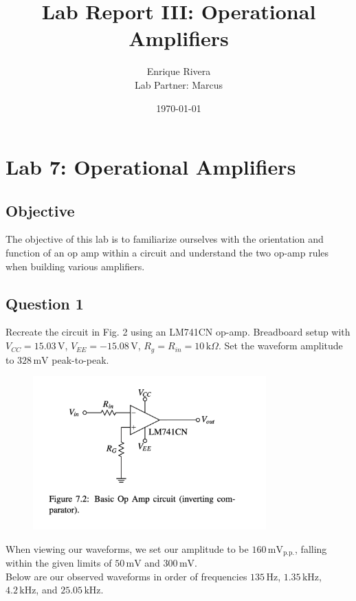 \documentclass{article}
\title{Lab Report III: Operational Amplifiers}
\author{Enrique Rivera \\ Lab Partner: Marcus}
\date{\today}
\begin{document}
\maketitle

\section*{Lab 7: Operational Amplifiers}

\subsection*{Objective}
The objective of this lab is to familiarize ourselves with the orientation 
and function of an op amp within a circuit and understand the two op-amp rules 
when building various amplifiers.

\subsection*{Question 1}
Recreate the circuit in Fig. 2 using an LM741CN op-amp. 
Breadboard setup with 
\( V_{CC} = 15.03 \, \text{V} \), \( V_{EE} = -15.08 \, \text{V} \), \( R_{g} = R_{in} = 10 \, \text{k}\Omega \). 
Set the waveform amplitude to \( 328 \, \text{mV} \) peak-to-peak.

\begin{figure}[H]
    \centering
    \includegraphics[width=0.8\textwidth]{img/Lab 7/1_1.png} 
    \caption{}
\end{figure}

When viewing our waveforms, we set our amplitude to be \( 160 \, \text{mV}_{\text{p.p.}} \), falling within the given
limits of \( 50 \, \text{mV} \) and \( 300 \, \text{mV} \). 
\\
Below are our observed waveforms in order of frequencies \( 135 \, \text{Hz} \), \( 1.35 \, \text{kHz} \), \( 4.2 \, \text{kHz} \), and
\( 25.05 \, \text{kHz} \).
\end{document}
